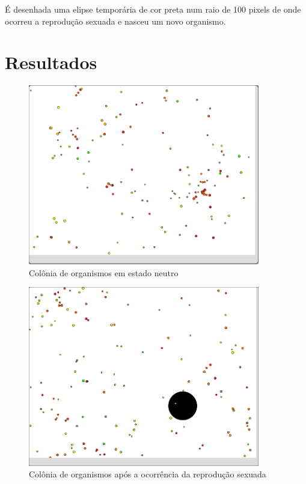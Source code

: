 \documentclass[
	12pt,				%
	oneside,			%
	a4paper,			%
	english,			%
	brazil,				%
	]{abntex2}
\begin{document}
{É desenhada uma elipse temporária de cor preta num raio de 100 pixels de onde ocorreu a reprodução sexuada e nasceu um novo organismo.

\section{Resultados}

\begin{figure}[H]
\centering
\includegraphics[width=0.9\textwidth]{imgs/img1.png}
\caption{Colônia de organismos em estado neutro}
\label{imagem 1}
\end{figure}
\begin{figure}[H]
\centering
\includegraphics[width=0.9\textwidth]{imgs/img2.png}
\caption{Colônia de organismos após a ocorrência da reprodução sexuada}
\label{imagem 2}
\end{figure}

}
\end{document}
